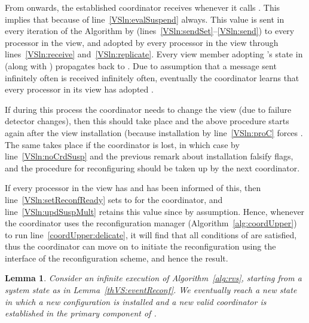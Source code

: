\documentclass[11pt]{article}
\newtheorem{lemma}[theorem]{Lemma}
\newenvironment{proof}{\noindent{\bf Proof.}}{\hfill}
\begin{document}
\begin{proof}
From  onwards, the established coordinator  receives  whenever it calls .
This implies that because of line~\ref{VSln:evalSuspend}  always.
This value is sent in every iteration of the Algorithm by  (lines~\ref{VSln:sendSet}--\ref{VSln:send}) to every processor in the view, and adopted by every processor in the view through lines~\ref{VSln:receive} and~\ref{VSln:replicate}.
Every view member  adopting 's state in  (along with ) propagates  back to .
Due to assumption that a message sent infinitely often is received infinitely often, eventually the coordinator learns that every processor in its view has adopted .

If during this process the coordinator needs to change the view (due to failure detector changes), then this should take place and the above procedure starts again after the view installation (because installation by line~\ref{VSln:proC} forces .
The same takes place if the coordinator is lost, in which case by line~\ref{VSln:noCrdSusp} and the previous remark about installation falsify  flags, and the procedure for reconfiguring should be taken up by the next coordinator.

If every processor in the view has  and  has been informed of this, then line~\ref{VSln:setReconfReady} sets  to  for the coordinator, and line~\ref{VSln:updSuspMult} retains this value since  by assumption.
Hence, whenever the coordinator uses the reconfiguration manager (Algorithm~\ref{alg:coordUpper}) to run line~\ref{coordUpper:delicate}, it will find that all conditions of  are satisfied, thus the coordinator can move on to initiate the reconfiguration using the  interface of the reconfiguration scheme, and hence the result.~\end{proof}

\begin{lemma} 
\label{thVS:stabAfterReconf}
Consider an infinite execution  of Algorithm~\ref{alg:rvs}, starting from a system state  as in Lemma~\ref{thVS:eventReconf}. 
We eventually reach a new state  in which a new configuration is installed and a new valid coordinator is established in the primary component of .
\end{lemma}
\end{document}
